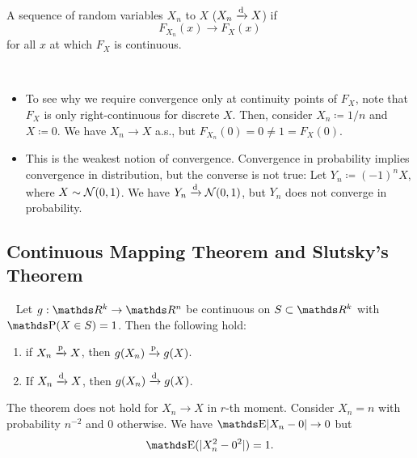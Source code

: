 \documentclass[letterpaper, 10pt]{article}
\begin{document}
\begin{definition}
  A sequence of random variables \(X_n\)  to \(X\) (\(X_n \xrightarrow{\mathrm{d}} X\)) if
  \[
    F_{X_n} (x) \longrightarrow F_X(x)
  \]
  for all \(x\) at which \(F_X\) is continuous.
\end{definition}
\begin{remark}~
  \begin{itemize}
    \item To see why we require convergence only at continuity points of \(F_X\), note that \(F_X\) is only right-continuous for discrete \(X\).
      Then, consider \(X_n \coloneqq 1 / n\) and \(X \coloneqq 0\).
      We have \(X_n \to X\) a.s., but \(F_{X_n}(0) = 0 \neq  1 = F_X(0)\).
    \item This is the weakest notion of convergence.
      Convergence in probability implies convergence in distribution, but the converse is not true:
      Let \(Y_n \coloneqq (-1)^n X\), where \(X \sim \mathcal{N}(0, 1)\).
      We have \(Y_n \xrightarrow{\mathrm{d}} \mathcal{N}(0, 1)\), but \(Y_n\) does not converge in probability.
  \end{itemize}
\end{remark}


\subsection{Continuous Mapping Theorem and Slutsky's Theorem}
\begin{theorem}~
  Let \(g: \RR^k \to \RR^n\) be continuous on \(S \subset \RR^k\) with \(\P(X \in S) = 1\).
  Then the following hold:
  \begin{enumerate}[label=(\roman*)]
    \item if \(X_n \xrightarrow{\mathrm{p}} X\), then \(g(X_n) \xrightarrow{\mathrm{p}} g(X)\). 
    \item If \(X_n \xrightarrow{\mathrm{d}} X\), then \(g(X_n) \xrightarrow{\mathrm{d}} g(X)\). 
  \end{enumerate}
\end{theorem}
\begin{remark}
  The theorem does not hold for \(X_n \to X\) in \(r\)-th moment.
  Consider \(X_n = n\) with probability \(n^{-2}\) and \(0\) otherwise.
  We have \(\E \abs{X_n - 0} \to 0\) but
  \[
    \E(\abs{X_n^2 - 0^2}) = 1.
  \]
\end{remark}
\end{document}
